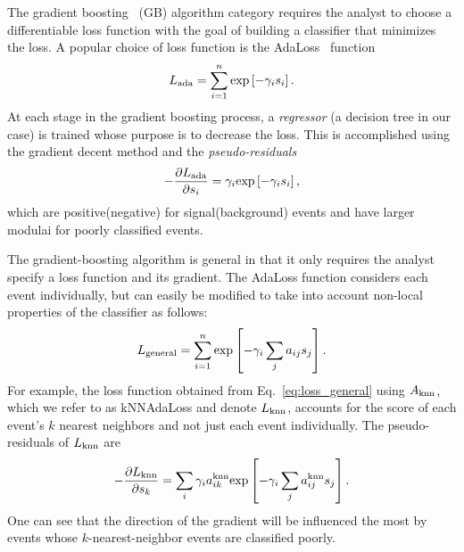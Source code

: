 The gradient boosting~\cite{ref:gradboost} (GB) algorithm category requires the analyst to choose a differentiable loss function with the goal of building a classifier that minimizes the loss.  
A popular choice of loss function is the AdaLoss~\cite{ref:adaboost} function 
\begin{equation}
L_{\rm ada} = \sum\limits_{i=1}^{n} {\rm exp}\left[-\gamma_i s_i\right]. 
\end{equation}
At each stage in the gradient boosting process, a {\em regressor} (a decision tree in our case) is trained whose purpose is to decrease the loss.  This is accomplished using the gradient decent method and the {\em pseudo-residuals}
\begin{equation}
  -\frac{\partial L_{\rm ada}}{\partial s_i} = \gamma_i  {\rm exp}\left[-\gamma_i s_i\right],
\end{equation}
which are positive(negative) for signal(background) events and have larger modulai for poorly classified events.  

The gradient-boosting algorithm is general in that it only requires the analyst specify a loss function and its gradient.  The AdaLoss function considers each event individually, but can easily be modified to take into account non-local properties of the classifier as follows:
\begin{equation}
  \label{eq:loss_general}
  L_{\rm general} = \sum\limits_{i=1}^{n} {\rm exp}\left[-\gamma_i \sum\limits_{j} a_{ij} s_j \right]. 
\end{equation} 
For example, the loss function obtained from Eq.~\ref{eq:loss_general} using $A_{\rm knn}$, which we refer to as kNNAdaLoss and denote $L_{\rm knn}$, accounts for the score of each event's $k$ nearest neighbors and not just each event individually.
The pseudo-residuals of $L_{\rm knn}$ are 
\begin{equation}
  -\frac{\partial L_{\rm knn}}{\partial s_k} = \sum\limits_i \gamma_i a_{ik}^{\rm knn} {\rm exp}\left[-\gamma_i \sum_j a_{ij}^{\rm knn} s_j \right].
\end{equation}
One can see that the direction of the gradient will be influenced the most by events whose $k$-nearest-neighbor events are classified poorly. 

